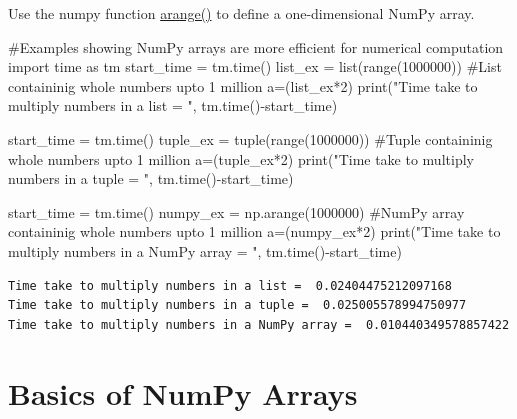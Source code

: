 \documentclass[
  letterpaper,
  DIV=11,
  numbers=noendperiod]{scrreprt}
\newenvironment{Shaded}{\begin{snugshade}}{\end{snugshade}}
\newcommand{\BuiltInTok}[1]{\textcolor[rgb]{0.00,0.23,0.31}{#1}}
\newcommand{\CommentTok}[1]{\textcolor[rgb]{0.37,0.37,0.37}{#1}}
\newcommand{\DecValTok}[1]{\textcolor[rgb]{0.68,0.00,0.00}{#1}}
\newcommand{\ImportTok}[1]{\textcolor[rgb]{0.00,0.46,0.62}{#1}}
\newcommand{\NormalTok}[1]{\textcolor[rgb]{0.00,0.23,0.31}{#1}}
\newcommand{\OperatorTok}[1]{\textcolor[rgb]{0.37,0.37,0.37}{#1}}
\newcommand{\StringTok}[1]{\textcolor[rgb]{0.13,0.47,0.30}{#1}}
\begin{document}
Use the numpy function
\href{https://numpy.org/doc/stable/reference/generated/numpy.arange.html}{arange()}
to define a one-dimensional NumPy array.

\begin{Shaded}
\begin{Highlighting}[]
\CommentTok{\#Examples showing NumPy arrays are more efficient for numerical computation}
\ImportTok{import}\NormalTok{ time }\ImportTok{as}\NormalTok{ tm}
\NormalTok{start\_time }\OperatorTok{=}\NormalTok{ tm.time()}
\NormalTok{list\_ex }\OperatorTok{=} \BuiltInTok{list}\NormalTok{(}\BuiltInTok{range}\NormalTok{(}\DecValTok{1000000}\NormalTok{)) }\CommentTok{\#List containinig whole numbers upto 1 million}
\NormalTok{a}\OperatorTok{=}\NormalTok{(list\_ex}\OperatorTok{*}\DecValTok{2}\NormalTok{)}
\BuiltInTok{print}\NormalTok{(}\StringTok{"Time take to multiply numbers in a list = "}\NormalTok{, tm.time()}\OperatorTok{{-}}\NormalTok{start\_time)}

\NormalTok{start\_time }\OperatorTok{=}\NormalTok{ tm.time()}
\NormalTok{tuple\_ex }\OperatorTok{=} \BuiltInTok{tuple}\NormalTok{(}\BuiltInTok{range}\NormalTok{(}\DecValTok{1000000}\NormalTok{)) }\CommentTok{\#Tuple containinig whole numbers upto 1 million}
\NormalTok{a}\OperatorTok{=}\NormalTok{(tuple\_ex}\OperatorTok{*}\DecValTok{2}\NormalTok{)}
\BuiltInTok{print}\NormalTok{(}\StringTok{"Time take to multiply numbers in a tuple = "}\NormalTok{, tm.time()}\OperatorTok{{-}}\NormalTok{start\_time)}

\NormalTok{start\_time }\OperatorTok{=}\NormalTok{ tm.time()}
\NormalTok{numpy\_ex }\OperatorTok{=}\NormalTok{ np.arange(}\DecValTok{1000000}\NormalTok{) }\CommentTok{\#NumPy array containinig whole numbers upto 1 million}
\NormalTok{a}\OperatorTok{=}\NormalTok{(numpy\_ex}\OperatorTok{*}\DecValTok{2}\NormalTok{)}
\BuiltInTok{print}\NormalTok{(}\StringTok{"Time take to multiply numbers in a NumPy array = "}\NormalTok{, tm.time()}\OperatorTok{{-}}\NormalTok{start\_time)}
\end{Highlighting}
\end{Shaded}

\begin{verbatim}
Time take to multiply numbers in a list =  0.02404475212097168
Time take to multiply numbers in a tuple =  0.025005578994750977
Time take to multiply numbers in a NumPy array =  0.010440349578857422
\end{verbatim}

\hypertarget{basics-of-numpy-arrays}{%
\section{Basics of NumPy Arrays}\label{basics-of-numpy-arrays}}
\end{document}
